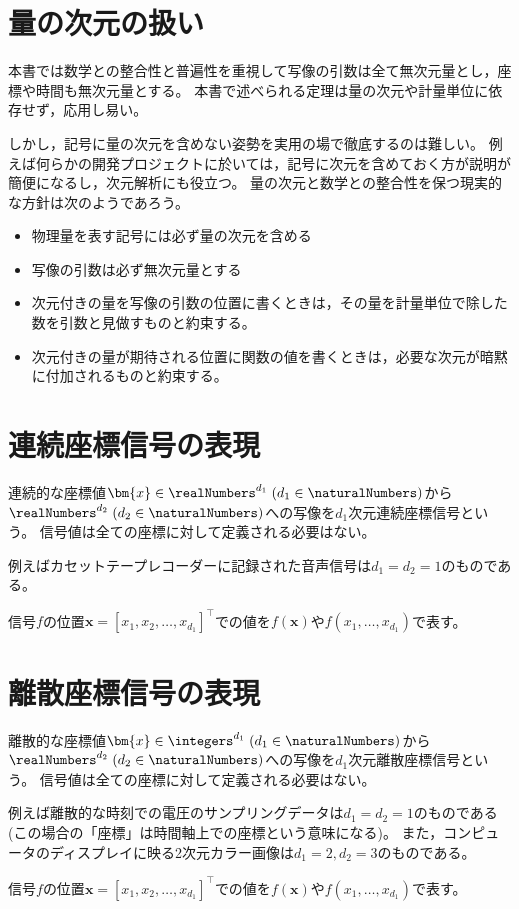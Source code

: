     \chapter{量の次元の扱い}
        本書では数学との整合性と普遍性を重視して写像の引数は全て無次元量とし，座標や時間も無次元量とする。
        本書で述べられる定理は量の次元や計量単位に依存せず，応用し易い。
        \par
        しかし，記号に量の次元を含めない姿勢を実用の場で徹底するのは難しい。
        例えば何らかの開発プロジェクトに於いては，記号に次元を含めておく方が説明が簡便になるし，次元解析にも役立つ。
        量の次元と数学との整合性を保つ現実的な方針は次のようであろう。
        \begin{itemize}
            \item 物理量を表す記号には必ず量の次元を含める
            \item 写像の引数は必ず無次元量とする
            \item 次元付きの量を写像の引数の位置に書くときは，その量を計量単位で除した数を引数と見做すものと約束する。
            \item 次元付きの量が期待される位置に関数の値を書くときは，必要な次元が暗黙に付加されるものと約束する。
        \end{itemize}
    \chapter{連続座標信号の表現}
        連続的な座標値$\bm{x}\in\realNumbers^{d_1}\;(d_1\in\naturalNumbers)$から$\realNumbers^{d_2}\;(d_2\in\naturalNumbers)$への写像を$d_1$次元連続座標信号という。
        信号値は全ての座標に対して定義される必要はない。
        \par
        例えばカセットテープレコーダーに記録された音声信号は$d_1=d_2=1$のものである。
        \par
        信号$f$の位置$\bm{x} = [x_1,x_2,\dots,x_{d_1}]^\top$での値を$f(\bm{x})$や$f(x_1,\dots,x_{d_1})$で表す。
    \chapter{離散座標信号の表現}
        離散的な座標値$\bm{x}\in\integers^{d_1}\;(d_1\in\naturalNumbers)$から$\realNumbers^{d_2}\;(d_2\in\naturalNumbers)$への写像を$d_1$次元離散座標信号という。
        信号値は全ての座標に対して定義される必要はない。
        \par
        例えば離散的な時刻での電圧のサンプリングデータは$d_1=d_2=1$のものである(この場合の「座標」は時間軸上での座標という意味になる)。
        また，コンピュータのディスプレイに映る2次元カラー画像は$d_1=2,d_2=3$のものである。
        \par
        信号$f$の位置$\bm{x} = [x_1,x_2,\dots,x_{d_1}]^\top$での値を$f(\bm{x})$や$f(x_1,\dots,x_{d_1})$で表す。
